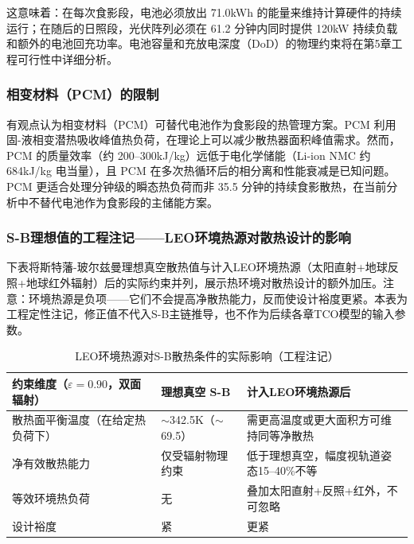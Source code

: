 这意味着：在每次食影段，电池必须放出 71.0\;kWh 的能量来维持计算硬件的持续运行；在随后的日照段，光伏阵列必须在 61.2 分钟内同时提供 120\;kW 持续负载和额外的电池回充功率。电池容量和充放电深度（DoD）的物理约束将在第5章工程可行性中详细分析。

\subsubsection{相变材料（PCM）的限制}

有观点认为相变材料（PCM）可替代电池作为食影段的热管理方案。PCM 利用固-液相变潜热吸收峰值热负荷，在理论上可以减少散热器面积峰值需求。然而，PCM 的质量效率（约 200--300\;kJ/kg）远低于电化学储能（Li-ion NMC 约 684\;kJ/kg 电当量），且 PCM 在多次热循环后的相分离和性能衰减是已知问题\cite{ijisrt2025pcm}。PCM 更适合处理分钟级的瞬态热负荷而非 35.5 分钟的持续食影散热，在当前分析中不替代电池作为食影段的主储能方案。

\subsubsection{S-B理想值的工程注记——LEO环境热源对散热设计的影响}

下表将斯特藩-玻尔兹曼理想真空散热值与计入LEO环境热源（太阳直射+地球反照+地球红外辐射）后的实际约束并列，展示热环境对散热设计的额外加压。注意：环境热源是负项——它们不会提高净散热能力，反而使设计裕度更紧。本表为工程定性注记，修正值不代入S-B主链推导，也不作为后续各章TCO模型的输入参数。

\begin{table}[H]
\centering
\caption{LEO环境热源对S-B散热条件的实际影响（工程注记）}
\label{tab:leo_sb_correction}
\small
\begin{tabularx}{0.96\textwidth}{
  >{\raggedright\arraybackslash}p{}
  >{\centering\arraybackslash}p{}
  >{\raggedright\arraybackslash}X
}
\toprule
\textbf{约束维度（$\varepsilon=0.90$，双面辐射）} & \textbf{理想真空 S-B} & \textbf{计入LEO环境热源后} \\
\midrule
散热面平衡温度（在给定热负荷下）     & $\sim$342.5\;K（$\sim$69.5\unitC{}） & 需更高温度或更大面积方可维持同等净散热 \\
净有效散热能力                       & 仅受辐射物理约束                  & 低于理想真空，幅度视轨道姿态15--40\%不等 \\
等效环境热负荷                        & 无                                & 叠加太阳直射+反照+红外，不可忽略            \\
设计裕度                              & 紧                                & 更紧                                           \\
\bottomrule
\end{tabularx}
\end{table}

